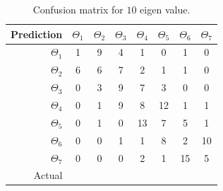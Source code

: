 \documentclass[runningheads,a4paper]{llncs}
\begin{document}
\begin{table}
\centering
\caption{Confusion matrix for $10$ eigen value.}
\label{tab:conf10}
\begin{tabular}{@{}r|ccccccc@{}}
\toprule
Prediction & \multicolumn{1}{r}{$\Theta_1$} & \multicolumn{1}{r}{$\Theta_2$} & \multicolumn{1}{r}{$\Theta_3$} & \multicolumn{1}{r}{$\Theta_4$} & \multicolumn{1}{r}{$\Theta_5$} & \multicolumn{1}{r}{$\Theta_6$} & \multicolumn{1}{r}{$\Theta_7$} \\ \midrule
$\Theta_1$ & 1                              & 9                              & 4                              & 1                              & 0                              & 1                              & 0                              \\
$\Theta_2$ & 6                              & 6                              & 7                              & 2                              & 1                              & 1                              & 0                              \\
$\Theta_3$ & 0                              & 3                              & 9                              & 7                              & 3                              & 0                              & 0                              \\
$\Theta_4$ & 0                              & 1                              & 9                              & 8                              & 12                             & 1                              & 1                              \\
$\Theta_5$ & 0                              & 1                              & 0                              & 13                             & 7                              & 5                              & 1                              \\
$\Theta_6$ & 0                              & 0                              & 1                              & 1                              & 8                              & 2                              & 10                             \\
$\Theta_7$ & 0                              & 0                              & 0                              & 2                              & 1                              & 15                             & 5                              \\ \midrule
Actual     & \multicolumn{1}{l}{}           & \multicolumn{1}{l}{}           & \multicolumn{1}{l}{}           & \multicolumn{1}{l}{}           & \multicolumn{1}{l}{}           & \multicolumn{1}{l}{}           & \multicolumn{1}{l}{}           \\ \cmidrule(r){1-1}
\end{tabular}
\end{table}
\end{document}
